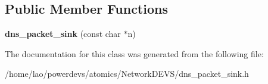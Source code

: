 \subsection*{Public Member Functions}
\begin{DoxyCompactItemize}
\item 
{\bfseries dns\+\_\+packet\+\_\+sink} (const char $\ast$n)\hypertarget{classdns__packet__sink_a2ead1895f1847c995f3bed2c10fe52e9}{}\label{classdns__packet__sink_a2ead1895f1847c995f3bed2c10fe52e9}

\end{DoxyCompactItemize}


The documentation for this class was generated from the following file\+:\begin{DoxyCompactItemize}
\item 
/home/lao/powerdevs/atomics/\+Network\+D\+E\+V\+S/dns\+\_\+packet\+\_\+sink.\+h\end{DoxyCompactItemize}
